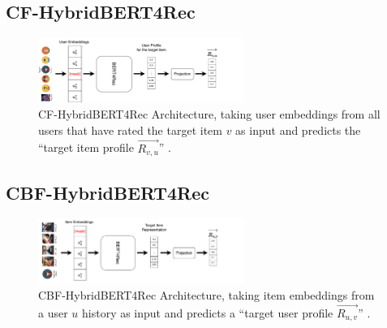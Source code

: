\documentclass{Academic}
\begin{document}
        \subsection{CF-HybridBERT4Rec}
        \begin{figure}[ht!]
            \centering
            \includegraphics[width=0.6\textwidth]{images/CF-HybridBERT4Rec.pdf}
            \caption{CF-HybridBERT4Rec Architecture, taking user embeddings from all users that have rated the target item $v$ as input and predicts the \enquote{target item profile $\overrightarrow{R_{v,u}}$} \cite{channarongHybridBERT4RecHybridContentBased2022}.}
            \label{fig:cf-arch}
        \end{figure}

        \subsection{CBF-HybridBERT4Rec}
        \begin{figure}[ht!]
            \centering
            \includegraphics[width=0.6\textwidth]{images/CBF-HybridBERT4Rec.pdf}
            \caption{CBF-HybridBERT4Rec Architecture, taking item embeddings from a user $u$ history as input and predicts a \enquote{target user profile $\overrightarrow{R_{u,v}}$} \cite{channarongHybridBERT4RecHybridContentBased2022}.}
            \label{fig:cbf-arch}
        \end{figure}
\end{document}
